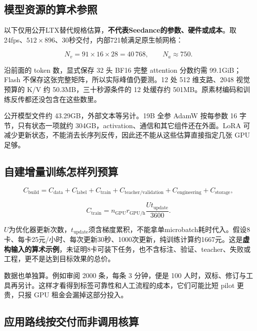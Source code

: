 \subsection{模型资源的算术参照}\label{seedance-m27-ux6a21ux578bux8d44ux6e90ux7684ux7b97ux672fux53c2ux7167}

以下仅用公开LTX替代规格估算，\textbf{不代表Seedance的参数、硬件或成本}。取24fps、\(512\times896\)、30秒交付，内部721帧满足原生帧网格：

\[
N_v=91\times16\times28=40\,768,\qquad N_a\approx750.
\]

沿前面的 token 数，显式保存 32 头 BF16 完整 attention 分数约需 99.1GiB；Flash 不保存这张完整矩阵，所以实际峰值仍要测。12 处 512 维支路、2048 视觉预算的 K/V 约 50.3MB，三十秒源条件的 12 处缓存约 501MB。原素材编码和训练反传都还没包含在这些数里。

公开模型文件约 43.29GB，外部文本等另计。19B 全参 AdamW 按每参数 16 字节，只有状态一项就约 304GB，activation、通信和其它组件还在外面。LoRA 可减少更新状态，不能消去长序列反传，因此还不能从这些估算直接指定几张 GPU 足够。

\subsection{自建增量训练怎样列预算}\label{seedance-m27-ux81eaux5efaux589eux91cfux8badux7ec3ux600eux6837ux5217ux9884ux7b97}

\[
C_{\mathrm{build}}=C_{\mathrm{data}}+C_{\mathrm{label}}+
C_{\mathrm{train}}+C_{\mathrm{teacher/validation}}+
C_{\mathrm{engineering}}+C_{\mathrm{storage}},
\]

\[
C_{\mathrm{train}}=n_{\mathrm{GPU}}r_{\mathrm{GPU/h}}
\frac{U t_{\mathrm{update}}}{3600}.
\]

\(U\)为优化器更新次数，\(t_{\mathrm{update}}\)须含梯度累积，不能拿单microbatch耗时代入。假设8卡、每卡25元/小时、每次更新30秒、1000次更新，纯训练计算约1667元。这是\textbf{虚构输入的算术示例}，未证明8卡可装下任务，也不含标注、验证、teacher、失败或工程，更不是达到目标效果的总价。

数据也单独算。例如审阅 2000 条，每条 3 分钟，便是 100 人时，双标、修订与工具再另计。这样才看得到标签可靠性和人工流程的成本，它们可能比短 pilot 更贵，只报 GPU 租金会漏掉这部分投入。

\subsection{应用路线按交付而非调用核算}\label{seedance-m27-ux5e94ux7528ux8defux7ebfux6309ux4ea4ux4ed8ux800cux975eux8c03ux7528ux6838ux7b97}

